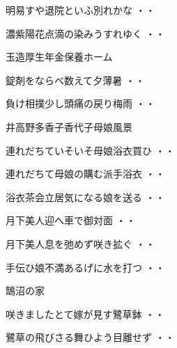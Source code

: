 \begin{shiika}明易すや退院といふ別れかな
\hfill{・・}\end{shiika}
\begin{shiika}濃紫陽花点滴の染みうすれゆく
\hfill{・・}\end{shiika}
\vspace{0.6cm}
玉造厚生年金保養ホーム
\begin{shiika}錠剤をならべ数えて夕薄暑
\hfill{・・}\end{shiika}
\begin{shiika}負け相撲少し頭痛の戻り梅雨
\hfill{・・}\end{shiika}
\vspace{0.6cm}
井高野多香子香代子母娘風景
\begin{shiika}連れだちていそいそ母娘浴衣買ひ
\hfill{・・}\end{shiika}
\vspace{0.6cm}
\begin{shiika}連れだちて母娘の購む派手浴衣
\hfill{・・}\end{shiika}
\vspace{0.6cm}
\begin{shiika}浴衣茶会立居気になる娘を送る
\hfill{・・}\end{shiika}
\vspace{0.6cm}
\begin{shiika}月下美人迎へ車で御対面
\hfill{・・}\end{shiika}
\vspace{0.6cm}
\begin{shiika}月下美人息を弛めず咲き拡ぐ
\hfill{・・}\end{shiika}
\vspace{0.6cm}
\begin{shiika}手伝ひ娘不満あるげに水を打つ
\hfill{・・}\end{shiika}
\vspace{0.6cm}
鵠沼の家
\begin{shiika}咲きましたとて嫁が見す鷺草鉢
\hfill{・・}\end{shiika}
\begin{shiika}鷺草の飛びさる舞ひよう目離せず
\hfill{・・}\end{shiika}
